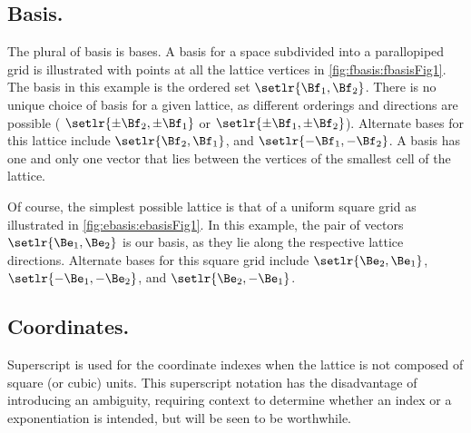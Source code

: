 \subsection{Basis.}
The plural of basis is bases.
A basis for a space subdivided into a parallopiped grid is illustrated with points at all the lattice vertices in
\cref{fig:fbasis:fbasisFig1}.
The basis in this example is the ordered set \( \setlr{\Bf_1, \Bf_2} \).
There is no unique choice of basis for a given lattice, as different orderings and directions are possible (
\( \setlr{\pm \Bf_2, \pm \Bf_1} \) or \( \setlr{\pm \Bf_1, \pm \Bf_2} \)).
Alternate bases for this lattice include \( \setlr{\Bf_2, \Bf_1} \), and \( \setlr{-\Bf_1, -\Bf_2} \).
A basis has one and only one vector that lies between the vertices of the smallest cell of the lattice.

Of course, the simplest possible lattice is that of a uniform square grid as illustrated in
\cref{fig:ebasis:ebasisFig1}.
In this example, the pair of vectors \( \setlr{\Be_1, \Be_2}\) is our basis, as they lie along the respective lattice directions.
Alternate bases for this square grid include \( \setlr{\Be_2, \Be_1} \), \( \setlr{-\Be_1, -\Be_2} \), and \( \setlr{\Be_2, -\Be_1} \).
\subsection{Coordinates.}
Superscript is used for the coordinate indexes when the lattice is not composed of square (or cubic) units.
This superscript notation has the disadvantage of introducing an ambiguity, requiring context to determine whether an index or a exponentiation is intended, but will be seen to be worthwhile.

